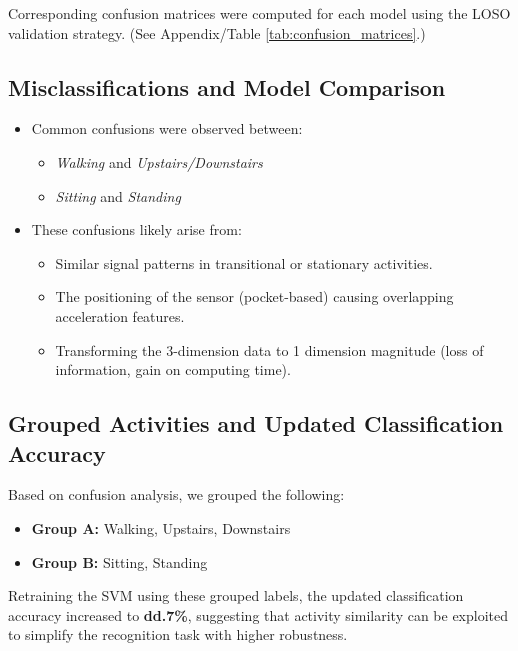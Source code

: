 \documentclass[runningheads]{llncs}
\begin{document}
Corresponding confusion matrices were computed for each model using the LOSO validation strategy. (See Appendix/Table \ref{tab:confusion_matrices}.)

\subsection{Misclassifications and Model Comparison}

\begin{itemize}
    \item Common confusions were observed between:
    \begin{itemize}
        \item \textit{Walking} and \textit{Upstairs/Downstairs}
        \item \textit{Sitting} and \textit{Standing}
    \end{itemize}
    \item These confusions likely arise from:
    \begin{itemize}
        \item Similar signal patterns in transitional or stationary activities.
        \item The positioning of the sensor (pocket-based) causing overlapping acceleration features.
        \item Transforming the 3-dimension data to 1 dimension magnitude (loss of information, gain on computing time).
    \end{itemize}
\end{itemize}

\subsection{Grouped Activities and Updated Classification Accuracy}

Based on confusion analysis, we grouped the following:
\begin{itemize}
    \item \textbf{Group A:} Walking, Upstairs, Downstairs
    \item \textbf{Group B:} Sitting, Standing
\end{itemize}

Retraining the SVM using these grouped labels, the updated classification accuracy increased to \textbf{dd.7\%}, suggesting that activity similarity can be exploited to simplify the recognition task with higher robustness.
\end{document}
